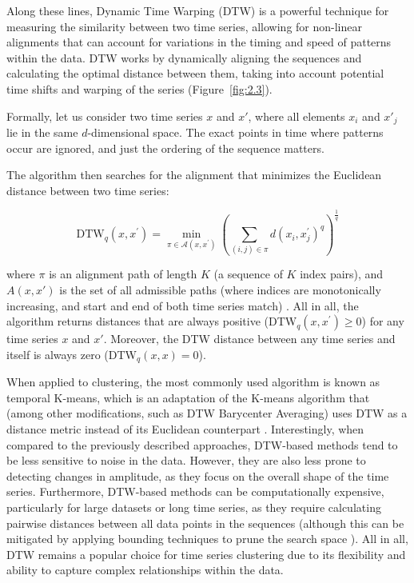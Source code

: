 Along these lines, Dynamic Time Warping (DTW) is a powerful technique for measuring the similarity between two time series, allowing for non-linear alignments that can account for variations in the timing and speed of patterns within the data. DTW works by dynamically aligning the sequences and calculating the optimal distance between them, taking into account potential time shifts and warping of the series (Figure~\ref{fig:2.3}).

Formally, let us consider two time series $x$ and $x'$, where all elements $x_i$ and $x'_j$ lie in the same $d$-dimensional space. The exact points in time where patterns occur are ignored, and just the ordering of the sequence matters.

The algorithm then searches for the alignment that minimizes the Euclidean distance between two time series:

\begin{equation}
\mathrm{DTW}_q({x}, {x}^\prime) =
    \min_{\pi \in \mathcal{A}({x}, {x}^\prime)}
        \left( \sum_{(i, j) \in \pi} d(x_i, x^\prime_j)^q \right)^{\frac{1}{q}}
\label{eq:2.3}
\end{equation}

where $\pi$ is an alignment path of length $K$ (a sequence of $K$ index pairs), and $A(x, x')$ is the set of all admissible paths (where indices are monotonically increasing, and start and end of both time series match) \cite{Tavenard2021AnWarping, Vintsyuk1968SpeechProgramming, Itakura1975MinimumRecognition, Sakoe1978DynamicRecognition}. All in all, the algorithm returns distances that are always positive (DTW$_q({x}, {x}^\prime) \geq 0$) for any time series $x$ and $x'$. Moreover, the DTW distance between any time series and itself is always zero (DTW$_q({x}, {x}) = 0$).

When applied to clustering, the most commonly used algorithm is known as temporal K-means, which is an adaptation of the K-means algorithm that (among other modifications, such as DTW Barycenter Averaging) uses DTW as a distance metric instead of its Euclidean counterpart \cite{Petitjean2011AClustering}. Interestingly, when compared to the previously described approaches, DTW-based methods tend to be less sensitive to noise in the data. However, they are also less prone to detecting changes in amplitude, as they focus on the overall shape of the time series. Furthermore, DTW-based methods can be computationally expensive, particularly for large datasets or long time series, as they require calculating pairwise distances between all data points in the sequences (although this can be mitigated by applying bounding techniques to prune the search space \cite{Tralie2020ExactMemory}). All in all, DTW remains a popular choice for time series clustering due to its flexibility and ability to capture complex relationships within the data.

